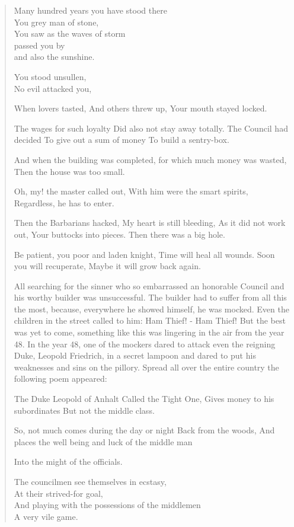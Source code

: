 \begin{quote}
Many hundred years you have stood there\\
You grey man of stone,\\
You saw as the waves of storm\\
passed you by\\
and also the sunshine.

You stood unsullen,\\
No evil attacked you,

When lovers tasted,
And others threw up,
Your mouth stayed locked.

The wages for such loyalty
Did also not stay away totally.
The Council had decided
To give out a sum of money
To build a sentry-box.

And when the building was completed,
for which much money was wasted,
Then the house was too small.

Oh, my! the master called out,
With him were the smart spirits,
Regardless, he has to enter.

Then the Barbarians hacked,
My heart is still bleeding,
As it did not work out,
Your buttocks into pieces.
Then there was a big hole.

Be patient, you poor
and laden knight,
Time will heal all wounds.
Soon you will recuperate,
Maybe it will grow back again.

All searching for the sinner who so embarrassed an honorable Council and his worthy builder was unsuccessful. The builder had to suffer from all this the most, because, everywhere he showed himself, he was mocked. Even the children in the street called to him: Ham Thief! - Ham Thief! But the best was yet to come, something like this was lingering in the air from the year 48. In the year 48, one of the mockers dared to attack even the reigning Duke, Leopold Friedrich, in a secret lampoon and dared to put his weaknesses and sins on the pillory. Spread all over the entire country the following poem appeared:

The Duke Leopold of Anhalt
Called the Tight One,
Gives money to his subordinates
But not the middle class.

So, not much comes during the day or night
Back from the woods,
And places the well being and luck of the middle man

Into the might of the officials.

The councilmen see themselves in ecstasy,\\
At their strived-for goal,\\
And playing with the possessions of the middlemen\\
A very vile game.


\end{quote}
